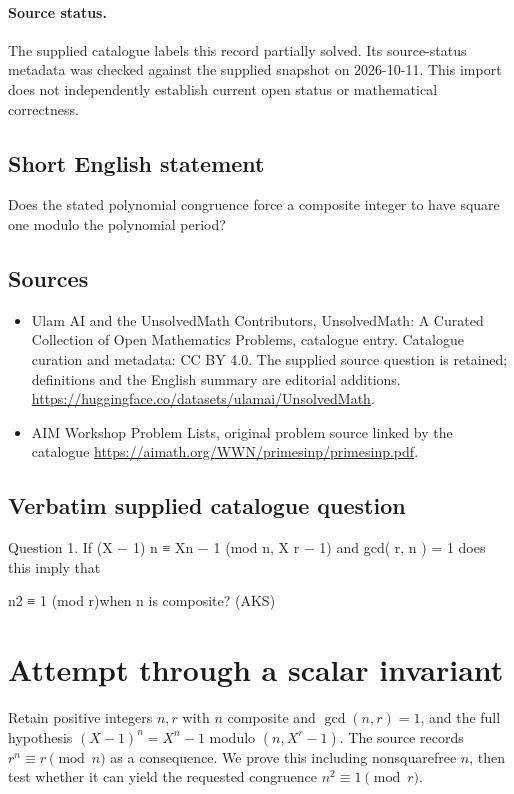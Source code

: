 \documentclass[11pt]{article}
\begin{document}
\paragraph{Source status.}
The supplied catalogue labels this record partially solved. Its source-status metadata was checked against the supplied snapshot on 2026-10-11. This import does not independently establish current open status or mathematical correctness.
\subsection{Short English statement}
Does the stated polynomial congruence force a composite integer to have square one modulo the polynomial period?
\subsection{Sources}
\begin{itemize}
\item[S1] Ulam AI and the UnsolvedMath Contributors, UnsolvedMath: A Curated Collection of Open Mathematics Problems, catalogue entry. Catalogue curation and metadata: CC BY 4.0. The supplied source question is retained; definitions and the English summary are editorial additions.
\url{https://huggingface.co/datasets/ulamai/UnsolvedMath}.
\item[S2] AIM Workshop Problem Lists, original problem source linked by the catalogue
\url{https://aimath.org/WWN/primesinp/primesinp.pdf}.
\end{itemize}
\subsection{Verbatim supplied catalogue question}
Question 1. If (X − 1) n ≡ Xn − 1 (mod n, X r − 1) and gcd( r, n ) = 1 does this imply that

n2 ≡ 1 (mod r)when n is composite? (AKS)

\section{Attempt through a scalar invariant}
Retain positive integers $n,r$ with $n$ composite and $\gcd(n,r)=1$,
and the full hypothesis $(X-1)^n=X^n-1$ modulo $(n,X^r-1)$.
The source records $r^n\equiv r\pmod n$ as a consequence. We prove
this including nonsquarefree $n$, then test whether it can yield the
requested congruence $n^2\equiv1\pmod r$.
\end{document}
